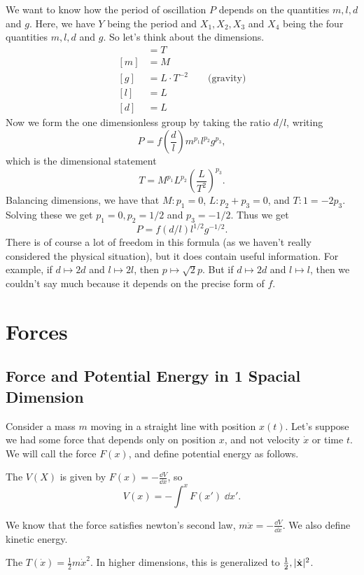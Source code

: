 \documentclass[a4paper]{scrartcl}
\newcommand{\newchapter}{\section}
\newcommand{\newsection}{\subsection}
\begin{document}
\begin{example}
\begin{center}
	\end{center}
	We want to know how the period of oscillation $P$ depends on the quantities $m, l, d$ and $g$. Here, we have $Y$ being the period and $X_1, X_2, X_3$ and $X_4$ being the four quantities $m, l, d$ and $g$. So let's think about the dimensions.
	\begin{align*}
		[P] &= T \\
		[m] &= M\\
		[g] &= L \cdot T^{-2} \quad \quad \text{(gravity)} \\
		[l] &= L\\
		[d] &= L
	\end{align*}
	Now we form the one dimensionless group by taking the ratio $d/l$, writing
	$$
	P = f\left(\frac{d}{l}\right) m^{p_1} l^{p_2} g^{p_3},
	$$
	which is the dimensional statement
	$$
	T = M^{p_1} L^{p_2} \left(\frac{L}{T^2}\right)^{p_3}.
	$$
	Balancing dimensions, we have that $M: p_1 = 0$, $L: p_2 + p_3 = 0$, and $T: 1 = -2p_3$. Solving these we get $p_1 = 0, p_2 = 1/2$ and $p_3 = -1/2$. Thus we get
	$$
	P = f(d/l) l^{1/2} g^{-1/2}.
	$$
	There is of course a lot of freedom in this formula (as we haven't really considered the physical situation), but it does contain useful information. For example, if $d \mapsto 2d$ and $l \mapsto 2l$, then $p \mapsto \sqrt{2}p$. But if $d \mapsto 2d$ and $l \mapsto l$, then we couldn't say much because it depends on the precise form of $f$. 
\end{example}

\newchapter{Forces}

\newsection{Force and Potential Energy in 1 Spacial Dimension}

Consider a mass $m$ moving in a straight line with position $x(t)$.
Let's suppose we had some force that depends only on position $x$, and not velocity $\dot{x}$ or time $t$.
We will call the force $F(x)$, and define potential energy as follows.

\begin{definition}
	The  $V(X)$ is given by $F(x) = -\frac{\dd V}{\dd x}$, so
	$$
	V(x) = - \int^x F(x') \; \dd x'.
	$$
\end{definition}

We know that the force satisfies newton's second law, $m \ddot{x} = - \frac{\dd V}{\dd x}$. We also define kinetic energy.

\begin{definition}
	The  $T(\dot{x}) = \frac{1}{2} m\dot{x}^2$. In higher dimensions, this is generalized to $\frac{1}{2}, |\dot{\mathbf{x}}|^2$.
\end{definition}
\end{document}
